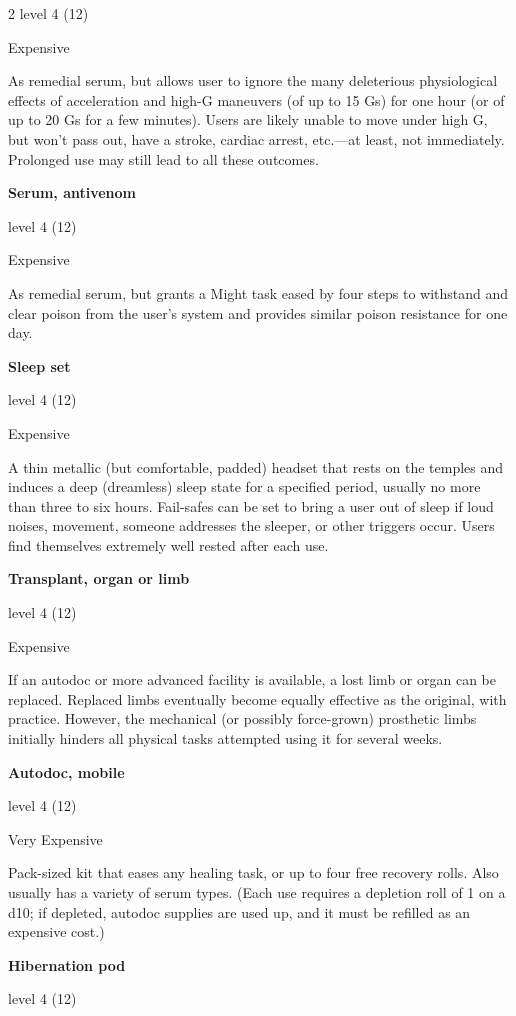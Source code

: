 \begin{multicols}{2}
level 4 (12) 

Expensive 

As remedial serum, but allows user to ignore the many deleterious physiological effects of acceleration and high-G maneuvers (of up to 15 Gs) for one hour (or of up to 20 Gs for a few minutes). Users are likely unable to move under high G, but won’t pass out, have a stroke, cardiac arrest, etc.—at least, not immediately. Prolonged use may still lead to all these outcomes. 

\textbf{Serum, antivenom} 

level 4 (12) 

Expensive 

As remedial serum, but grants a Might task eased by four steps to withstand and clear poison from the user’s system and provides similar poison resistance for one day. 

\textbf{Sleep set} 

level 4 (12) 

Expensive 

A thin metallic (but comfortable, padded) headset that rests on the temples and induces a deep (dreamless) sleep state for a specified period, usually no more than three to six hours. Fail-safes can be set to bring a user out of sleep if loud noises, movement, someone addresses the sleeper, or other triggers occur. Users find themselves extremely well rested after each use. 

\textbf{Transplant, organ or limb} 

level 4 (12) 

Expensive 

If an autodoc or more advanced facility is available, a lost limb or organ can be replaced. Replaced limbs eventually become equally effective as the original, with practice. However, the mechanical (or possibly force-grown) prosthetic limbs initially hinders all physical tasks attempted using it for several weeks. 

\textbf{Autodoc, mobile} 

level 4 (12) 

Very Expensive 

Pack-sized kit that eases any healing task, or up to four free recovery rolls. Also usually has a variety of serum types. (Each use requires a depletion roll of 1 on a d10; if depleted, autodoc supplies are used up, and it must be refilled as an expensive cost.) 

\textbf{Hibernation pod} 

level 4 (12) 


\end{multicols}
